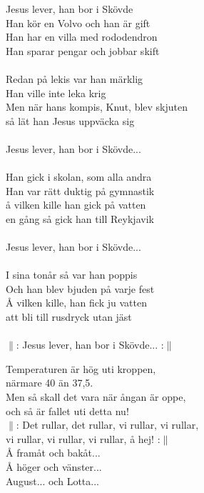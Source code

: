 \documentclass[a6paper, 10pt, twoside]{article}
\begin{document}
\begin{center}
\end{center}
\begin{lyrics}
\vspace{-5pt}
\small Jesus lever, han bor i Skövde\\
Han kör en Volvo och han är gift\\
Han har en villa med rododendron\\
Han sparar pengar och jobbar skift\\
\vspace{5pt}\\
Redan på lekis var han märklig\\
Han ville inte leka krig\\
Men när hans kompis, Knut, blev skjuten\\
så lät han Jesus uppväcka sig\\
\vspace{5pt}\\
Jesus lever, han bor i Skövde...\\
\vspace{5pt}\\
Han gick i skolan, som alla andra\\
Han var rätt duktig på gymnastik\\
å vilken kille han gick på vatten\\
en gång så gick han till Reykjavik\\
\vspace{5pt}\\
Jesus lever, han bor i Skövde...\\
\vspace{5pt}\\
I sina tonår så var han poppis\\
Och han blev bjuden på varje fest\\
Å vilken kille, han fick ju vatten\\
att bli till rusdryck utan jäst\\
\vspace{5pt}\\
$\|$: Jesus lever, han bor i Skövde... :$\|$\\
\end{lyrics}
\begin{center}
\end{center}
\begin{lyrics}
\small Temperaturen är hög uti kroppen,\\ 
närmare 40 än 37,5.\\ 
Men så skall det vara när ångan är oppe,\\ 
och så är fallet uti detta nu!\\ 
$\|$: Det rullar, det rullar, vi rullar, vi rullar,\\ 
vi rullar, vi rullar, vi rullar, å hej! :$\|$\\\digitalonly{\\}
Å framåt och bakåt...\\
Å höger och vänster...\\ 
August... och Lotta... 
\end{lyrics}
\end{document}
